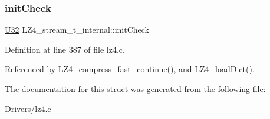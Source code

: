 \subsubsection{\texorpdfstring{init\+Check}{initCheck}}
{\footnotesize\ttfamily \mbox{\hyperlink{lz4_8c_ac3df7cf3c8cb172a588adec881447d68}{U32}} L\+Z4\+\_\+stream\+\_\+t\+\_\+internal\+::init\+Check}



Definition at line 387 of file lz4.\+c.



Referenced by L\+Z4\+\_\+compress\+\_\+fast\+\_\+continue(), and L\+Z4\+\_\+load\+Dict().



The documentation for this struct was generated from the following file\+:\begin{DoxyCompactItemize}
\item 
Drivers/\mbox{\hyperlink{lz4_8c}{lz4.\+c}}\end{DoxyCompactItemize}
